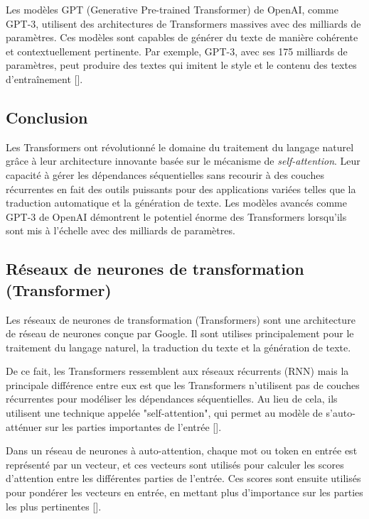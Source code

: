 Les modèles GPT (Generative Pre-trained Transformer) de OpenAI, comme GPT-3,
utilisent des architectures de Transformers massives avec des milliards de
paramètres. Ces modèles sont capables de générer du texte de manière cohérente
et contextuellement pertinente. Par exemple, GPT-3, avec ses 175 milliards de
paramètres, peut produire des textes qui imitent le style et le contenu des
textes d'entraînement [\cite{brown2020language}].

\subsection{Conclusion}

Les Transformers ont révolutionné le domaine du traitement du langage naturel
grâce à leur architecture innovante basée sur le mécanisme de
\textit{self-attention}. Leur capacité à gérer les dépendances séquentielles
sans recourir à des couches récurrentes en fait des outils puissants pour des
applications variées telles que la traduction automatique et la génération de
texte. Les modèles avancés comme GPT-3 de OpenAI démontrent le potentiel énorme
des Transformers lorsqu’ils sont mis à l’échelle avec des milliards de
paramètres.

\subsection{Réseaux de neurones de transformation (Transformer)}
Les réseaux de neurones de transformation (Transformers) sont une architecture
de réseau de neurones conçue par Google. Il sont utilises principalement pour
le traitement du langage naturel, la traduction du texte et la génération de
texte.

\medskip
De ce fait, les Transformers ressemblent aux réseaux récurrents (RNN) mais la principale différence entre eux est que les Transformers n'utilisent pas de couches récurrentes pour modéliser les dépendances séquentielles. Au lieu de cela, ils utilisent une technique appelée "self-attention", qui permet au modèle de s'auto-atténuer sur les parties importantes de l'entrée [\cite{attention_is_all_you_need}].

\medskip
Dans un réseau de neurones à auto-attention, chaque mot ou token en entrée est représenté par un vecteur, et ces vecteurs sont utilisés pour calculer les scores d'attention entre les différentes parties de l'entrée. Ces scores sont ensuite utilisés pour pondérer les vecteurs en entrée, en mettant plus d'importance sur les parties les plus pertinentes [\cite{attention_is_all_you_need}].

